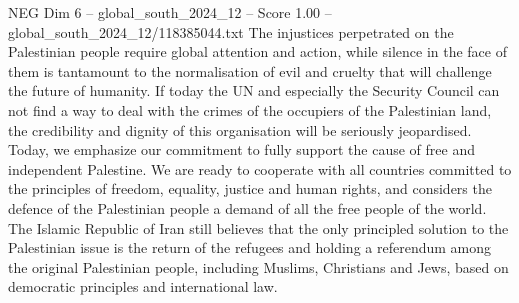 \begin{textsample}{NEG Dim 6 – global\_south\_2024\_12 – Score 1.00 – global\_south\_2024\_12/118385044.txt}
The injustices perpetrated on the Palestinian people require global attention and action, while silence in the face of them is tantamount to the normalisation of evil and cruelty that will challenge the future of humanity.
If today the UN and especially the Security Council can not find a way to deal with the crimes of the occupiers of the Palestinian land, the credibility and dignity of this organisation will be seriously jeopardised.
Today, we emphasize our commitment to fully support the cause of free and independent Palestine.
We are ready to cooperate with all countries committed to the principles of freedom, equality, justice and human rights, and considers the defence of the Palestinian people a demand of all the free people of the world.
The Islamic Republic of Iran still believes that the only principled solution to the Palestinian issue is the return of the refugees and holding a referendum among the original Palestinian people, including Muslims, Christians and Jews, based on democratic principles and international law.

\end{textsample}
